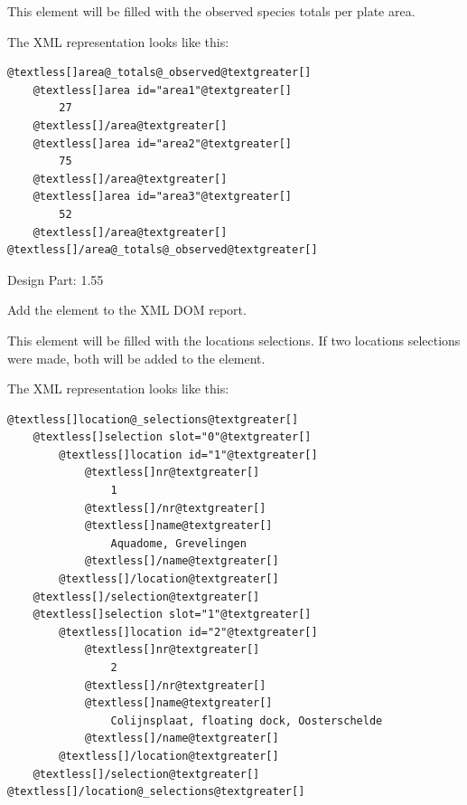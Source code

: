 \documentclass[letterpaper,10pt,english]{sphinxmanual}
\begin{document}
\begin{fulllineitems}
\begin{fulllineitems}
This element will be filled with the observed species totals per
plate area.

The XML representation looks like this:

\begin{Verbatim}[commandchars=@\[\]]
@textless[]area@_totals@_observed@textgreater[]
    @textless[]area id="area1"@textgreater[]
        27
    @textless[]/area@textgreater[]
    @textless[]area id="area2"@textgreater[]
        75
    @textless[]/area@textgreater[]
    @textless[]area id="area3"@textgreater[]
        52
    @textless[]/area@textgreater[]
@textless[]/area@_totals@_observed@textgreater[]
\end{Verbatim}

Design Part: 1.55

\end{fulllineitems}


\begin{fulllineitems}
\label{setlyze/std:setlyze.std.ReportGenerator.set_location_selections}
Add the element  to the XML DOM
report.

This element will be filled with the locations selections. If
two locations selections were made, both will be added to the
element.

The XML representation looks like this:

\begin{Verbatim}[commandchars=@\[\]]
@textless[]location@_selections@textgreater[]
    @textless[]selection slot="0"@textgreater[]
        @textless[]location id="1"@textgreater[]
            @textless[]nr@textgreater[]
                1
            @textless[]/nr@textgreater[]
            @textless[]name@textgreater[]
                Aquadome, Grevelingen
            @textless[]/name@textgreater[]
        @textless[]/location@textgreater[]
    @textless[]/selection@textgreater[]
    @textless[]selection slot="1"@textgreater[]
        @textless[]location id="2"@textgreater[]
            @textless[]nr@textgreater[]
                2
            @textless[]/nr@textgreater[]
            @textless[]name@textgreater[]
                Colijnsplaat, floating dock, Oosterschelde
            @textless[]/name@textgreater[]
        @textless[]/location@textgreater[]
    @textless[]/selection@textgreater[]
@textless[]/location@_selections@textgreater[]
\end{Verbatim}


\end{fulllineitems}
\end{fulllineitems}
\end{document}
